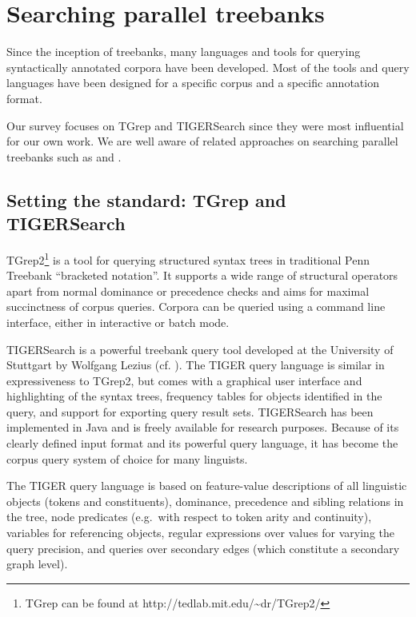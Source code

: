 \documentclass[output=paper]{LSP/langsci}
\begin{document}
\section{Searching parallel treebanks}\label{sec:volk:3}

Since the inception of treebanks, many languages and tools for querying syntactically annotated corpora have been developed. Most of the tools and query languages have been designed for a specific corpus and a specific annotation format. 

Our survey focuses on TGrep and TIGERSearch since they were most influential for our own work. We are well aware of related approaches on searching parallel treebanks such as \citet{Nygaard2004} and \citet{Petersen2006}. 

\subsection{Setting the standard: TGrep and TIGERSearch}\label{sec:volk:3.1}

TGrep2\footnote{TGrep can be found at http://tedlab.mit.edu/{\textasciitilde}dr/TGrep2/} \citep{Rohde2005} is a tool for querying structured syntax trees in traditional Penn Treebank ``bracketed notation''. It supports a wide range of structural operators apart from normal dominance or precedence checks and aims for maximal succinctness of corpus queries. Corpora can be queried using a command line interface, either in interactive or batch mode. 

TIGERSearch is a powerful treebank query tool developed at the University of Stuttgart by Wolfgang Lezius (cf. \citealt{König2002,Lezius2002a}). The TIGER query language is similar in expressiveness to TGrep2, but comes with a graphical user interface and highlighting of the syntax trees, frequency tables for objects identified in the query, and support for exporting query result sets. TIGERSearch has been implemented in Java and is freely available for research purposes. Because of its clearly defined input format and its powerful query language, it has become the corpus query system of choice for many linguists. 

The TIGER query language is based on feature-value descriptions of all linguistic objects (tokens and constituents), dominance, precedence and sibling relations in the tree, node predicates (e.g.~with respect to token arity and continuity), variables for referencing objects, regular expressions over values for varying the query precision, and queries over secondary edges (which constitute a secondary graph level). 
\end{document}
